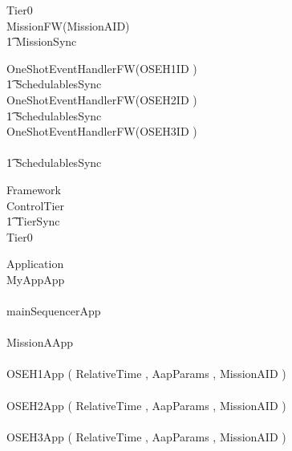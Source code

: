 \begin{circus}
\circprocess Tier0 \circdef \\

\circblockopen
	MissionFW(MissionAID)\\
		\t1 	\lpar MissionSync \rpar \\
		\circblockopen











\circblockopen

	OneShotEventHandlerFW(OSEH1ID   )\\
		\t1 \lpar SchedulablesSync \rpar\\

	OneShotEventHandlerFW(OSEH2ID   )\\
		\t1 \lpar SchedulablesSync \rpar\\

	OneShotEventHandlerFW(OSEH3ID   )\\



\circblockclose \\

\t1 \lpar SchedulablesSync \rpar\\




		\circblockclose
\circblockclose
\end{circus}
%
%
%
\begin{circus}
\circprocess Framework \circdef \\
\circblockopen
ControlTier \\
\t1 \lpar TierSync \rpar \\
 \circblockopen
Tier0
\circblockclose
\circblockclose
\end{circus}
%
%
\begin{circus}
\circprocess  Application \circdef \\
\circblockopen
MyAppApp\\
\interleave\\
mainSequencerApp\\
\interleave \\
		MissionAApp\\
		\interleave \\
			OSEH1App ( RelativeTime ,  AapParams ,  MissionAID  ) \\
			\interleave \\
			OSEH2App ( RelativeTime ,  AapParams ,  MissionAID  ) \\
			\interleave \\
			OSEH3App ( RelativeTime ,  AapParams ,  MissionAID  ) \\
			
		
\circblockclose
\end{circus}
